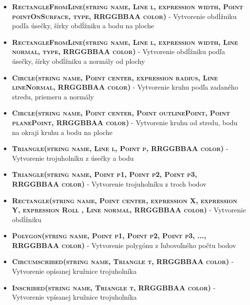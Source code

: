 \begin{itemize}

\item \textsc{\textbf{RectangleFromLine(string name, Line l, expression width, Point pointOnSurface, type, RRGGBBAA color)}} - Vytvorenie obdĺžniku podľa úsečky, šírky obdĺžniku a bodu na ploche  %
	
\item \textsc{\textbf{RectangleFromLine(string name, Line l, expression width, Line normal, type, RRGGBBAA color)}} - Vytvorenie obdĺžniku podľa úsečky, šírky obdĺžniku a normály od plochy %

\item \textsc{\textbf{Circle(string name, Point center, expression radius, Line lineNormal, RRGGBBAA color)}} - Vytvorenie kruhu podľa zadaného stredu, priemeru a normály%
	
\item \textsc{\textbf{Circle(string name, Point center, Point outlinePoint, Point planePoint, RRGGBBAA color)}} - Vytvorenie kruhu od stredu, bodu na okraji kruhu a bodu na ploche %

\item \textsc{\textbf{Triangle(string name, Line l, Point p, RRGGBBAA color)}} - Vytvorenie trojuholníku z úsečky a bodu%
	
\item \textsc{\textbf{Triangle(string name, Point p1, Point p2, Point p3, RRGGBBAA color)}} -  Vytvorenie trojuholníku z troch bodov%


\item \textsc{\textbf{Rectangle(string name, Point center, expression X, expression Y, expression Roll
    , Line normal, RRGGBBAA color)}} - Vytvorenie obdĺžniku%

\item \textsc{\textbf{Polygon(string name, Point p1, Point p2, Point p3, ..., RRGGBBAA color)}} - Vytvorenie polygónu z ľubovoľného počtu bodov%


\item \textsc{\textbf{Circumscribed(string name, Triangle t, RRGGBBAA color)}}  - Vytvorenie opísanej kružnice trojuholníka %
	
\item \textsc{\textbf{Inscribed(string name, Triangle t, RRGGBBAA color)}} - Vytvorenie vpísanej kružnice trojuholníka %
	
\end{itemize}
